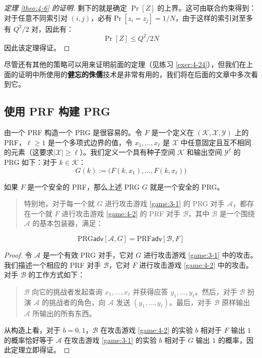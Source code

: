 \begin{proof}[定理 \ref{theo:4-6} 的证明]
剩下的就是确定 $\Pr[Z]$ 的上界。这可由联合约束得到：对于任意不同索引对 $(i,j)$，必有$\Pr[z_i=z_j]={1}/{N}$，由于这样的索引对至多有 ${Q^2}/{2}$ 对，因此有：
\[
\Pr[Z]\leq{Q^2}/{2N}
\]
因此该定理得证。
\end{proof}

尽管还有其他的策略可以用来证明前面的定理（见练习 \ref{exer:4-24}），但我们在上面的证明中所使用的\textbf{健忘的侏儒}技术是非常有用的，我们将在后面的文章中多次看到它。

\subsection{使用 PRF 构建 PRG}\label{subsec:4-4-4}

由一个 PRF 构造一个 PRG 是很容易的。令 $F$ 是一个定义在 $(\mathcal{K},\mathcal{X},\mathcal{Y})$ 上的 PRF，$\ell\geq1$ 是一个多项式边界的值，令 $x_1,\dots,x_\ell$ 是 $\mathcal{X}$ 中任意固定且互不相同的元素（这要求$|\mathcal{X}|\geq\ell$）。我们定义一个具有种子空间 $\mathcal{K}$ 和输出空间 $\mathcal{Y}^\ell$ 的 PRG 如下：对于 $k\in\mathcal{K}$：
\[
G(k):=
\big(
F(k,x_1),\dots,F(k,x_\ell)
\big)
\]

\begin{theorem}\label{theo:4-8}
如果 $F$ 是一个安全的 PRF，那么上述 PRG $G$ 就是一个安全的 PRG。
\begin{quote}
特别地，对于每一个就 $G$ 进行攻击游戏 \ref{game:3-1} 的 PRG 对手 $\mathcal{A}$，都存在一个就 $F$ 进行攻击游戏 \ref{game:4-2} 的 PRF 对手 $\mathcal{B}$，其中 $\mathcal{B}$ 是一个围绕 $\mathcal{A}$ 的基本包装器，满足：
\end{quote}
\[
\mathrm{PRG}\mathsf{adv}[\mathcal{A},G]= 
\mathrm{PRF}\mathsf{adv}[\mathcal{B},F]
\]
\end{theorem}

\begin{proof}
令 $\mathcal{A}$ 是一个有效 PRG 对手，它对 $G$ 进行攻击游戏 \ref{game:3-1} 中的攻击。我们描述一个相应的 PRF 对手 $\mathcal{B}$，它对 $F$ 进行攻击游戏 \ref{game:4-2} 中的攻击。对手 $\mathcal{B}$ 的工作方式如下：
\begin{quote}
$\mathcal{B}$ 向它的挑战者发起查询 $x_1,\dots,x_\ell$ 并获得应答 $y_1,\dots,y_\ell$。然后，对手 $\mathcal{B}$ 扮演 $\mathcal{A}$ 的挑战者的角色，向 $\mathcal{A}$ 发送 $(y_1,\dots,y_\ell)$。最后，对手 $\mathcal{B}$ 原样输出 $\mathcal{A}$ 所输出的所有东西。
\end{quote}

从构造上看，对于 $b=0,1$，$\mathcal{B}$ 在攻击游戏 \ref{game:4-2} 的实验 $b$ 相对于 $F$ 输出 $1$ 的概率恰好等于 $\mathcal{A}$ 在攻击游戏 \ref{game:3-1} 的实验 $b$ 相对于 $G$ 输出 $1$ 的概率，因此定理立即得证。
\end{proof}


